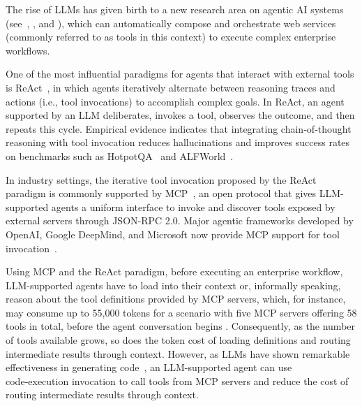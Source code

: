 \documentclass[runningheads]{llncs}
\begin{document}
The rise of LLMs has given birth to a new research area on agentic AI systems (see~\cite{raheem2025agentic}, \cite{dwivedi2026agentic}, and \cite{acharya2025agentic}), which can automatically compose and orchestrate web services (commonly referred to as tools in this context) to execute complex enterprise workflows.

One of the most influential paradigms for agents that interact with external tools is ReAct~\cite{yao2022react}, in which agents iteratively alternate between reasoning traces and actions (i.e., tool invocations) to accomplish complex goals. In ReAct, an agent supported by an LLM deliberates, invokes a tool, observes the outcome, and then repeats this cycle. Empirical evidence indicates that integrating chain‑of‑thought reasoning with tool invocation reduces hallucinations and improves success rates on benchmarks such as HotpotQA~\cite{yang2018hotpotqa} and ALFWorld~\cite{shridhar2020alfworld}.

In industry settings, the iterative tool invocation proposed by the ReAct paradigm is commonly supported by MCP~\cite{mcp_intro_2024}, an open protocol that gives LLM-supported agents a uniform interface to invoke and discover tools exposed by external servers through JSON‑RPC 2.0. Major agentic frameworks developed by OpenAI, Google DeepMind, and Microsoft now provide MCP support for tool invocation~\cite{hou2025model}.

Using MCP and the ReAct paradigm, before executing an enterprise workflow, LLM-supported agents have to load into their context or, informally speaking, reason about the tool definitions provided by MCP servers, which, for instance, may consume up to 55,000 tokens for a scenario with five MCP servers offering 58 tools in total, before the agent conversation begins \cite{anthropic_advanced_tool_use_2025}. Consequently, as the number of tools available grows, so does the token cost of loading definitions and routing intermediate results through context. However, as LLMs have shown remarkable effectiveness in generating code~\cite{joel2024survey}, an LLM-supported agent can use code‑execution invocation to call tools from MCP servers and reduce the cost of routing intermediate results through context. 
\end{document}
